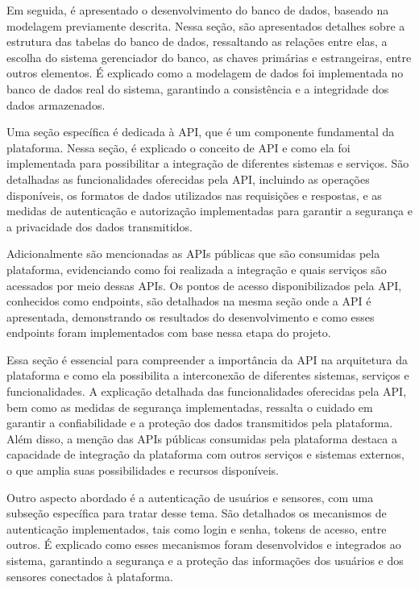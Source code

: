 \documentclass[tcc,capa]{texufpel}
\begin{document}
Em seguida, é apresentado o desenvolvimento do banco de dados, baseado na modelagem previamente descrita. Nessa seção, são apresentados detalhes sobre a estrutura das tabelas do banco de dados, ressaltando as relações entre elas, a escolha do sistema gerenciador do banco, as chaves primárias e estrangeiras, entre outros elementos. É explicado como a modelagem de dados foi implementada no banco de dados real do sistema, garantindo a consistência e a integridade dos dados armazenados.

Uma seção específica é dedicada à API, que é um componente fundamental da plataforma. Nessa seção, é explicado o conceito de API e como ela foi implementada para possibilitar a integração de diferentes sistemas e serviços. São detalhadas as funcionalidades oferecidas pela API, incluindo as operações disponíveis, os formatos de dados utilizados nas requisições e respostas, e as medidas de autenticação e autorização implementadas para garantir a segurança e a privacidade dos dados transmitidos.

Adicionalmente são mencionadas as APIs públicas que são consumidas pela plataforma, evidenciando como foi realizada a integração e quais serviços são acessados por meio dessas APIs. Os pontos de acesso disponibilizados pela API, conhecidos como endpoints, são detalhados na mesma seção onde a API é apresentada, demonstrando os resultados do desenvolvimento e como esses endpoints foram implementados com base nessa etapa do projeto.

Essa seção é essencial para compreender a importância da API na arquitetura da plataforma e como ela possibilita a interconexão de diferentes sistemas, serviços e funcionalidades. A explicação detalhada das funcionalidades oferecidas pela API, bem como as medidas de segurança implementadas, ressalta o cuidado em garantir a confiabilidade e a proteção dos dados transmitidos pela plataforma. Além disso, a menção das APIs públicas consumidas pela plataforma destaca a capacidade de integração da plataforma com outros serviços e sistemas externos, o que amplia suas possibilidades e recursos disponíveis. 

Outro aspecto abordado é a autenticação de usuários e sensores, com uma subseção específica para tratar desse tema. São detalhados os mecanismos de autenticação implementados, tais como login e senha, tokens de acesso, entre outros. É explicado como esses mecanismos foram desenvolvidos e integrados ao sistema, garantindo a segurança e a proteção das informações dos usuários e dos sensores conectados à plataforma.
\end{document}
